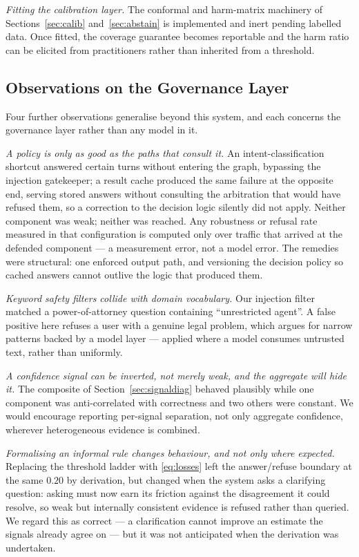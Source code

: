 \documentclass[conference]{IEEEtran}
\begin{document}
\emph{Fitting the calibration layer.} The conformal and harm-matrix machinery of
Sections~\ref{sec:calib} and~\ref{sec:abstain} is implemented and inert pending
labelled data. Once fitted, the coverage guarantee becomes reportable and the
harm ratio can be elicited from practitioners rather than inherited from a
threshold.

\subsection{Observations on the Governance Layer}
Four further observations generalise beyond this system, and each concerns the
governance layer rather than any model in it.

\emph{A policy is only as good as the paths that consult it.} An
intent-classification shortcut answered certain turns without entering the graph,
bypassing the injection gatekeeper; a result cache produced the same failure at
the opposite end, serving stored answers without consulting the arbitration that
would have refused them, so a correction to the decision logic silently did not
apply. Neither component was weak; neither was reached. Any robustness or
refusal rate measured in that configuration is computed only over traffic that
arrived at the defended component --- a measurement error, not a model error.
The remedies were structural: one enforced output path, and versioning the
decision policy so cached answers cannot outlive the logic that produced them.

\emph{Keyword safety filters collide with domain vocabulary.} Our injection
filter matched a power-of-attorney question containing ``unrestricted agent''.
A false positive here refuses a user with a genuine legal problem, which argues
for narrow patterns backed by a model layer --- applied where a model consumes
untrusted text, rather than uniformly.

\emph{A confidence signal can be inverted, not merely weak, and the aggregate
will hide it.} The composite of Section~\ref{sec:signaldiag} behaved plausibly
while one component was anti-correlated with correctness and two others were
constant. We would encourage reporting per-signal separation, not only aggregate
confidence, wherever heterogeneous evidence is combined.

\emph{Formalising an informal rule changes behaviour, and not only where
expected.} Replacing the threshold ladder with \eqref{eq:losses} left the
answer/refuse boundary at the same $0.20$ by derivation, but changed when the
system asks a clarifying question: asking must now earn its friction against the
disagreement it could resolve, so weak but internally consistent evidence is
refused rather than queried. We regard this as correct --- a clarification
cannot improve an estimate the signals already agree on --- but it was not
anticipated when the derivation was undertaken.
\end{document}
